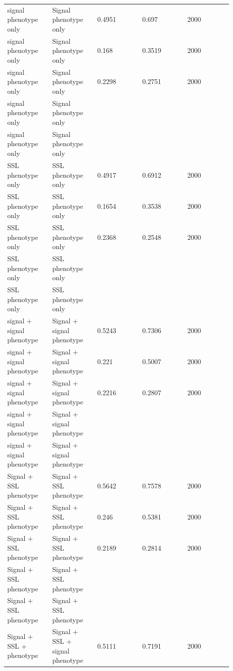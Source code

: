 \documentclass[11pt]{article}
\begin{document}
\begin{landscape}
\begin{longtable}{L{0.184\linewidth} L{0.184\linewidth} L{0.184\linewidth} L{0.184\linewidth} L{0.184\linewidth}}
signal phenotype only & Signal phenotype only & 0.\allowbreak{}4951 & 0.\allowbreak{}697 & 2000 \\
signal phenotype only & Signal phenotype only & 0.\allowbreak{}168 & 0.\allowbreak{}3519 & 2000 \\
signal phenotype only & Signal phenotype only & 0.\allowbreak{}2298 & 0.\allowbreak{}2751 & 2000 \\
signal phenotype only & Signal phenotype only &  &  &  \\
signal phenotype only & Signal phenotype only &  &  &  \\
SSL phenotype only & SSL phenotype only & 0.\allowbreak{}4917 & 0.\allowbreak{}6912 & 2000 \\
SSL phenotype only & SSL phenotype only & 0.\allowbreak{}1654 & 0.\allowbreak{}3538 & 2000 \\
SSL phenotype only & SSL phenotype only & 0.\allowbreak{}2368 & 0.\allowbreak{}2548 & 2000 \\
SSL phenotype only & SSL phenotype only &  &  &  \\
SSL phenotype only & SSL phenotype only &  &  &  \\
signal + signal phenotype & Signal + signal phenotype & 0.\allowbreak{}5243 & 0.\allowbreak{}7306 & 2000 \\
signal + signal phenotype & Signal + signal phenotype & 0.\allowbreak{}221 & 0.\allowbreak{}5007 & 2000 \\
signal + signal phenotype & Signal + signal phenotype & 0.\allowbreak{}2216 & 0.\allowbreak{}2807 & 2000 \\
signal + signal phenotype & Signal + signal phenotype &  &  &  \\
signal + signal phenotype & Signal + signal phenotype &  &  &  \\
Signal + SSL phenotype & Signal + SSL phenotype & 0.\allowbreak{}5642 & 0.\allowbreak{}7578 & 2000 \\
Signal + SSL phenotype & Signal + SSL phenotype & 0.\allowbreak{}246 & 0.\allowbreak{}5381 & 2000 \\
Signal + SSL phenotype & Signal + SSL phenotype & 0.\allowbreak{}2189 & 0.\allowbreak{}2814 & 2000 \\
Signal + SSL phenotype & Signal + SSL phenotype &  &  &  \\
Signal + SSL phenotype & Signal + SSL phenotype &  &  &  \\
Signal + SSL + phenotype & Signal + SSL + signal phenotype & 0.\allowbreak{}5111 & 0.\allowbreak{}7191 & 2000 \\

\end{longtable}
\end{landscape}
\end{document}
